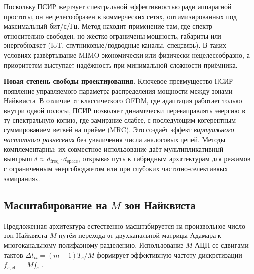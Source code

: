 \documentclass[a4paper,12pt]{article}
\numberwithin{equation}{section}
\begin{document}
Поскольку ПСИР жертвует спектральной эффективностью ради аппаратной простоты, он нецелесообразен в коммерческих сетях, оптимизированных под максимальный бит/с/Гц. Метод находит применение там, где спектр относительно свободен, но жёстко ограничены мощность, габариты или энергобюджет (IoT, спутниковые/подводные каналы, спецсвязь). В таких условиях развёртывание MIMO экономически или физически нецелесообразно, а приоритетом выступает надёжность при минимальной сложности приёмника.

\textbf{Новая степень свободы проектирования.} 
Ключевое преимущество ПСИР --- появление управляемого параметра распределения мощности между зонами Найквиста. В отличие от классического OFDM, где адаптация работает только внутри одной полосы, ПСИР позволяет динамически перенаправлять энергию в ту спектральную копию, где замирание слабее, с последующим когерентным суммированием ветвей на приёме (MRC). Это создаёт эффект \textit{виртуального частотного разнесения} без увеличения числа аналоговых цепей. Методы комплементарны: их совместное использование даёт мультипликативный выигрыш $d \approx d_{\text{freq}} \cdot d_{\text{space}}$, открывая путь к гибридным архитектурам для режимов с ограниченным энергобюджетом или при глубоких частотно-селективных замираниях.

\subsection{Масштабирование на $M$ зон Найквиста}
\label{subsec:scaling}

Предложенная архитектура естественно масштабируется на произвольное число зон Найквиста $M$ путём перехода от двухканальной матрицы Адамара к многоканальному полифазному разделению. Использование $M$ АЦП со сдвигами тактов $\Delta t_m = (m-1)T_s/M$ формирует эффективную частоту дискретизации $f_{s,\text{eff}} = M f_s$ \cite{harris}.
\end{document}
